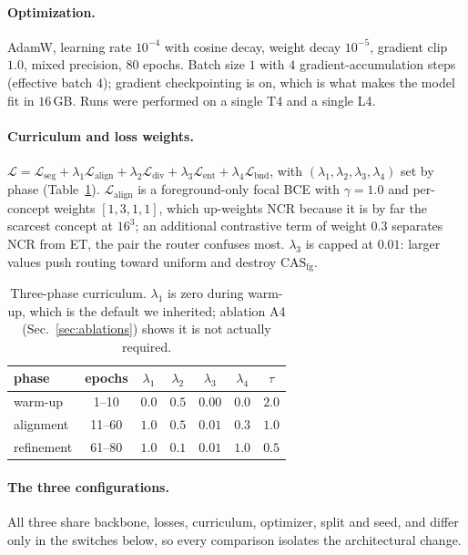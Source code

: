 \documentclass[10pt,twocolumn,letterpaper]{article}
\newcommand{\casfg}{\mathrm{CAS}_{\mathrm{fg}}}
\begin{document}
\paragraph{Optimization.}
AdamW, learning rate $10^{-4}$ with cosine decay, weight decay $10^{-5}$, gradient clip
$1.0$, mixed precision, $80$ epochs. Batch size $1$ with $4$ gradient-accumulation steps
(effective batch $4$); gradient checkpointing is on, which is what makes the model fit in
$16$\,GB. Runs were performed on a single T4 and a single L4.

\paragraph{Curriculum and loss weights.}
$\mathcal{L}=\mathcal{L}_{\text{seg}}+\lambda_1\mathcal{L}_{\text{align}}
+\lambda_2\mathcal{L}_{\text{div}}+\lambda_3\mathcal{L}_{\text{ent}}
+\lambda_4\mathcal{L}_{\text{bnd}}$, with $(\lambda_1,\lambda_2,\lambda_3,\lambda_4)$ set by
phase (Table~\ref{tab:curriculum}). $\mathcal{L}_{\text{align}}$ is a foreground-only focal
BCE with $\gamma{=}1.0$ and per-concept weights $[1,3,1,1]$, which up-weights NCR because it
is by far the scarcest concept at $16^3$; an additional contrastive term of weight $0.3$
separates NCR from ET, the pair the router confuses most. $\lambda_3$ is capped at $0.01$:
larger values push routing toward uniform and destroy $\casfg$.

\begin{table}[t]\centering\footnotesize
\setlength{\tabcolsep}{4pt}
\caption{Three-phase curriculum. $\lambda_1$ is zero during warm-up, which is the default we
inherited; ablation A4 (Sec.~\ref{sec:ablations}) shows it is not actually required.}
\label{tab:curriculum}
\begin{tabular}{lcccccc}
\toprule
phase & epochs & $\lambda_1$ & $\lambda_2$ & $\lambda_3$ & $\lambda_4$ & $\tau$ \\
\midrule
warm-up     & 1--10  & $0.0$ & $0.5$ & $0.00$ & $0.0$ & $2.0$ \\
alignment   & 11--60 & $1.0$ & $0.5$ & $0.01$ & $0.3$ & $1.0$ \\
refinement  & 61--80 & $1.0$ & $0.1$ & $0.01$ & $1.0$ & $0.5$ \\
\bottomrule
\end{tabular}
\end{table}

\paragraph{The three configurations.}
All three share backbone, losses, curriculum, optimizer, split and seed, and differ only in
the switches below, so every comparison isolates the architectural change.
\end{document}
